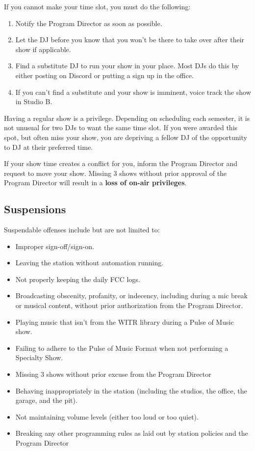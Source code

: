 \documentclass{witrman}
\begin{document}
If you cannot make your time slot, you must do the following:

\begin{enumerate}
    \item Notify the Program Director as soon as possible.
    \item Let the DJ before you know that you won't be there to take over after
        their show if applicable.
    \item Find a substitute DJ to run your show in your place.  Most DJs do
        this by either posting on Discord or putting a sign up in the office.
    \item If you can't find a substitute and your show is imminent,
        voice track the show in Studio B.
\end{enumerate}

Having a regular show is a privilege.  Depending on scheduling each semester, it
is not unusual for two DJs to want the same time slot.  If you were awarded this
spot, but often miss your show, you are depriving a fellow DJ of the opportunity
to DJ at their preferred time.

If your show time creates a conflict for you, inform the Program Director
and request to move your show.  Missing 3 shows without prior approval of the
Program Director will result in a \textbf{loss of on-air privileges}.


\subsection{Suspensions}

Suspendable offenses include but are not limited to:

\begin{itemize}
    \item Improper sign-off/sign-on.
    \item Leaving the station without automation running. 
    \item Not properly keeping the daily FCC logs.
    \item Broadcasting obscenity, profanity, or indecency, including during a
        mic break or musical content, without prior authorization from the Program
        Director.
    \item Playing music that isn't from the WITR library during a Pulse of Music
        show.
    \item Failing to adhere to the Pulse of Music Format when not performing
    a Specialty Show.
    \item Missing 3 shows without prior excuse from the Program Director
    \item Behaving inappropriately in the station (including the studios, the
        office, the garage, and the pit).
    \item Not maintaining volume levels (either too loud or too quiet).
    \item Breaking any other programming rules as laid out by station policies
        and the Program Director
\end{itemize}
\end{document}
